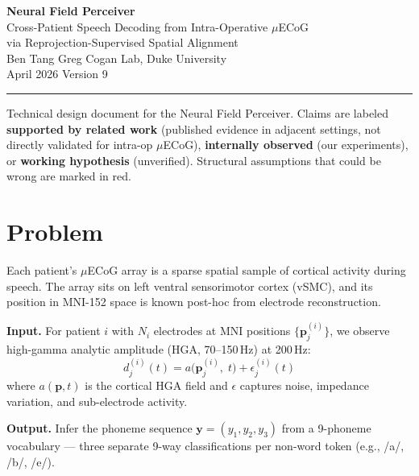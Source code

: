 \documentclass[11pt,letterpaper]{article}
\newcommand{\bfp}{\mathbf{p}}
\newcommand{\bfy}{\mathbf{y}}
\begin{document}
\begin{center}
{\LARGE\bfseries Neural Field Perceiver}\\[6pt]
{\large Cross-Patient Speech Decoding from Intra-Operative $\mu$ECoG\\via Reprojection-Supervised Spatial Alignment}\\[12pt]
{\normalsize Ben Tang \quad\textbar\quad Greg Cogan Lab, Duke University}\\[4pt]
{\normalsize April 2026 \quad\textbar\quad Version 9}
\end{center}

\medskip\noindent\rule{\textwidth}{0.4pt}\medskip

\noindent Technical design document for the Neural Field Perceiver.
Claims are labeled \textbf{supported by related work} (published evidence in adjacent settings, not directly validated for intra-op $\mu$ECoG), \textbf{internally observed} (our experiments), or \textbf{working hypothesis} (unverified).
Structural assumptions that could be wrong are marked in \textcolor{BrickRed}{red}.

\tableofcontents
\newpage



\section{Problem}\label{sec:problem}

Each patient's $\mu$ECoG array is a sparse spatial sample of cortical activity during speech. The array sits on left ventral sensorimotor cortex (vSMC), and its position in MNI-152 space is known post-hoc from electrode reconstruction.

\textbf{Input.} For patient $i$ with $N_i$ electrodes at MNI positions $\{\bfp_j^{(i)}\}$, we observe high-gamma analytic amplitude (HGA, 70--150\,Hz) at 200\,Hz:
\begin{equation}\label{eq:observation}
d_j^{(i)}(t) = a\bigl(\bfp_j^{(i)},\; t\bigr) + \epsilon_j^{(i)}(t)
\end{equation}
where $a(\bfp, t)$ is the cortical HGA field and $\epsilon$ captures noise, impedance variation, and sub-electrode activity.

\textbf{Output.} Infer the phoneme sequence $\bfy = (y_1, y_2, y_3)$ from a 9-phoneme vocabulary --- three separate 9-way classifications per non-word token (e.g., /a/, /b/, /e/).
\end{document}

